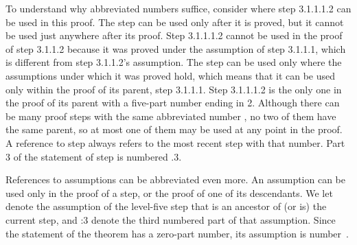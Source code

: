 %
%
To understand why abbreviated numbers suffice, consider where step
3.1.1.1.2 can be used in this proof.  The step can be used only after
it is proved, but it cannot be used just anywhere after its proof.  Step
3.1.1.1.2 cannot be used in the proof of step 3.1.1.2 because it was
proved under the assumption of step 3.1.1.1, which is different from
step 3.1.1.2's assumption.  The step can be used only where the
assumptions under which it was proved hold, which means that it can be
used only within the proof of its parent, step 3.1.1.1.  Step
3.1.1.1.2 is the only one in the proof of its parent with a five-part
number ending in 2.  Although there can be many proof steps with the
same abbreviated number , no two of them have
the same parent, so at most one of them may be used at any point in
the proof.  A reference to step  always refers
to the most recent step with that number.  Part 3 of the statement of
step  is numbered .3.


References to assumptions can be abbreviated even more.  An assumption
can be used only in the proof of a step, or the proof of one of its
descendants.  We let  denote the assumption of the
level-five step that is an ancestor of (or is) the current step, and
:3 denote the third numbered part of that
assumption.  Since the statement of the theorem has a zero-part
number, its assumption is number~.


